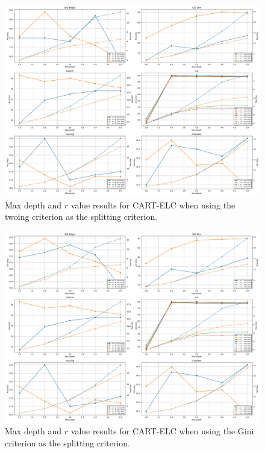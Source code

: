 \documentclass[10pt]{article} %
\begin{document}
\begin{figure}[h]
\includegraphics[width=\linewidth]{twoing.pdf}
\caption{Max depth and $r$ value results for CART-ELC when using the twoing criterion as the splitting criterion.}
\label{graph_twoing}
\end{figure}

\begin{figure}[h]
	\includegraphics[width=\linewidth]{gini.pdf}
	\caption{Max depth and $r$ value results for CART-ELC when using the Gini criterion as the splitting criterion.}
\label{graph_gini}
\end{figure}
\end{document}
